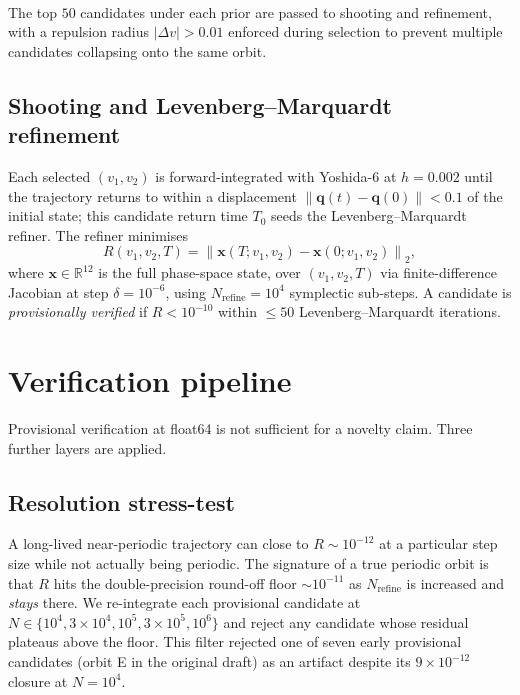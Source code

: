 \documentclass[11pt]{article}
\newcommand{\qvec}{\mathbf{q}}
\newcommand{\Norm}[1]{\left\lVert#1\right\rVert}
\newcommand{\RR}{\mathbb{R}}
\begin{document}
\paragraph{}The top $50$ candidates under each prior are passed to
shooting and refinement, with a repulsion radius
$|\Delta v| > 0.01$ enforced during selection to prevent multiple
candidates collapsing onto the same orbit.

\subsection{Shooting and Levenberg--Marquardt refinement}

Each selected $(v_1, v_2)$ is forward-integrated with Yoshida-$6$ at
$h = 0.002$ until the trajectory returns to within a displacement
$\Norm{\qvec(t) - \qvec(0)} < 0.1$ of the initial state; this
candidate return time $T_0$ seeds the Levenberg--Marquardt refiner.
The refiner minimises
\begin{equation}
  R(v_1, v_2, T) = \Norm{\mathbf{x}(T; v_1, v_2) - \mathbf{x}(0; v_1, v_2)}_2,
  \label{eq:closure-residual}
\end{equation}
where $\mathbf{x} \in \RR^{12}$ is the full phase-space state, over
$(v_1, v_2, T)$ via finite-difference Jacobian at step
$\delta = 10^{-6}$, using $N_{\text{refine}} = 10^4$ symplectic
sub-steps. A candidate is \emph{provisionally verified} if
$R < 10^{-10}$ within $\le\!50$ Levenberg--Marquardt iterations.

\section{Verification pipeline}
\label{sec:verification}

Provisional verification at float64 is not sufficient for a novelty
claim. Three further layers are applied.

\subsection{Resolution stress-test}

A long-lived near-periodic trajectory can close to $R \sim 10^{-12}$
at a particular step size while not actually being periodic. The
signature of a true periodic orbit is that $R$ hits the
double-precision round-off floor $\sim\!10^{-11}$ as
$N_{\text{refine}}$ is increased and \emph{stays} there. We
re-integrate each provisional candidate at
$N \in \{10^4, 3\!\times\!10^4, 10^5, 3\!\times\!10^5, 10^6\}$ and
reject any candidate whose residual plateaus above the floor. This
filter rejected one of seven early provisional candidates (orbit E
in the original draft) as an artifact despite its
$9\!\times\!10^{-12}$ closure at $N = 10^4$.
\end{document}
